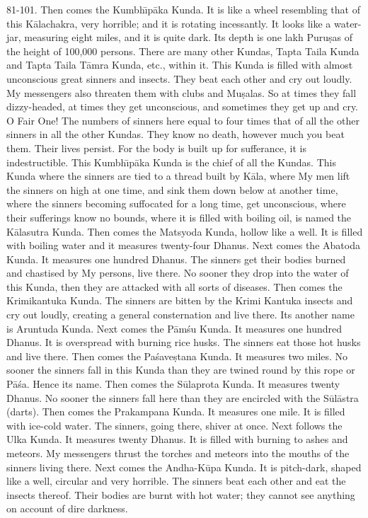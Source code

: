 81-101. Then comes the Kumbh\={\i}p\=aka Kunda. It is like a wheel resembling that of this K\=alachakra, very horrible; and it is rotating incessantly. It looks like a water-jar, measuring eight miles, and it is quite dark. Its depth is one lakh Puru\d{s}as of the height of 100,000 persons. There are many other Kundas, Tapta Taila Kunda and Tapta Taila T\=amra Kunda, etc., within it. This Kunda is filled with almost unconscious great sinners and insects. They beat each other and cry out loudly. My messengers also threaten them with clubs and Mu\d{s}alas. So at times they fall dizzy-headed, at times they get unconscious, and sometimes they get up and cry. O Fair One! The numbers of sinners here equal to four times that of all the other sinners in all the other Kundas. They know no death, however much you beat them. Their lives persist. For the body is built up for sufferance, it is indestructible. This Kumbh\={\i}p\=aka Kunda is the chief of all the Kundas. This Kunda where the sinners are tied to a thread built by K\=ala, where My men lift the sinners on high at one time, and sink them down below at another time, where the sinners becoming suffocated for a long time, get unconscious, where their sufferings know no bounds, where it is filled with boiling oil, is named the K\=alasutra Kunda. Then comes the Matsyoda Kunda, hollow like a well. It is filled with boiling water and it measures twenty-four Dhanus. Next comes the Abatoda Kunda. It measures one hundred Dhanus. The sinners get their bodies burned and chastised by My persons, live there. No sooner they drop into the water of this Kunda, then they are attacked with all sorts of diseases. Then comes the Krimikantuka Kunda. The sinners are bitten by the Krimi Kantuka insects and cry out loudly, creating a general consternation and live there. Its another name is Aruntuda Kunda. Next comes the P\=am\'su Kunda. It measures one hundred Dhanus. It is overspread with burning rice husks. The sinners eat those hot husks and live there. Then comes the Pa\'save\d{s}tana Kunda. It measures two miles. No sooner the sinners fall in this Kunda than they are twined round by this rope or P\=a\'sa. Hence its name. Then comes the S\=ulaprota Kunda. It measures twenty Dhanus. No sooner the sinners fall here than they are encircled with the S\=ul\=astra (darts). Then comes the Prakampana Kunda. It measures one mile. It is filled with ice-cold water. The sinners, going there, shiver at once. Next follows the Ulka Kunda. It measures twenty Dhanus. It is filled with burning to ashes and meteors. My messengers thrust the torches and meteors into the mouths of the sinners living there. Next comes the Andha-K\=upa Kunda. It is pitch-dark, shaped like a well, circular and very horrible. The sinners beat each other and eat the insects thereof. Their bodies are burnt with hot water; they cannot see anything on account of dire darkness.

